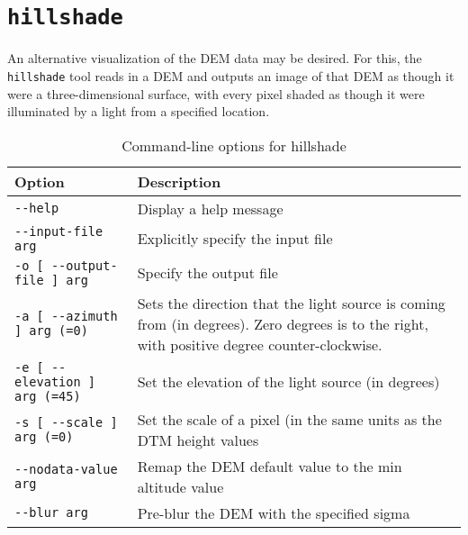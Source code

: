 \section{{\tt hillshade}}\label{sec:hillshade}

An alternative visualization of the DEM data may be desired. For this,
the \verb#hillshade# tool reads in a DEM and outputs an image of that
DEM as though it were a three-dimensional surface, with every pixel
shaded as though it were illuminated by a light from a specified
location.

\begin{longtable}{|l|p{11cm}|} 
\caption{Command-line options for hillshade}
\label{tbl:hillshade}
\endfirsthead
\endhead
\endfoot
\endlastfoot
\hline
Option & Description \\ \hline \hline
\verb#--help# & Display a help message\\ \hline
\verb#--input-file arg# & Explicitly specify the input file\\ \hline
\verb#-o [ --output-file ] arg# & Specify the output file\\ \hline
\verb#-a [ --azimuth ] arg (=0)# & Sets the direction that the light source is coming from (in degrees).  Zero degrees is to the right, with positive degree counter-clockwise.\\ \hline
\verb#-e [ --elevation ] arg (=45)# & Set the elevation of the light source (in degrees)\\ \hline
\verb#-s [ --scale ] arg (=0)# & Set the scale of a pixel (in the same units as the DTM height values\\ \hline
\verb#--nodata-value arg# & Remap the DEM default value to the min altitude value\\ \hline
\verb#--blur arg# & Pre-blur the DEM with the specified sigma\\ \hline
\end{longtable}




